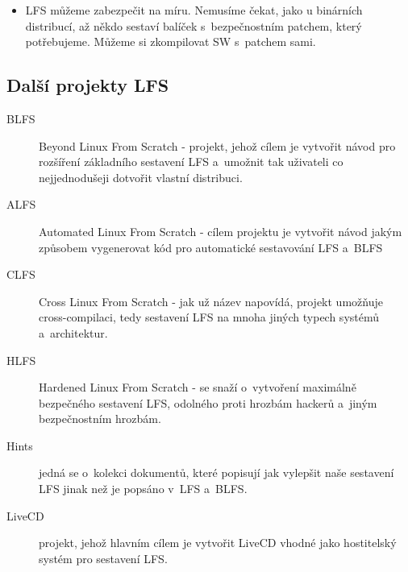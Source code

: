 \documentclass[a4paper,12pt]{article}
\begin{document}
\begin{itemize}

\item LFS můžeme zabezpečit na míru. Nemusíme čekat, jako u binárních distribucí, až někdo sestaví balíček s~bezpečnostním patchem, který potřebujeme. Můžeme si zkompilovat SW s~patchem sami.

\end{itemize}

\subsection{Další projekty LFS}
\begin{description}
 \item[BLFS] Beyond Linux From Scratch - projekt, jehož cílem je vytvořit návod pro rozšíření základního sestavení LFS a~umožnit tak uživateli co nejjednodušeji dotvořit vlastní distribuci.
 \item[ALFS] Automated Linux From Scratch - cílem projektu je vytvořit návod jakým způsobem vygenerovat kód pro automatické sestavování LFS a~BLFS
 \item[CLFS] Cross Linux From Scratch - jak už název napovídá, projekt umožňuje cross-compilaci, tedy sestavení LFS na mnoha jiných typech systémů a~architektur.
 \item[HLFS] Hardened Linux From Scratch - se snaží o~vytvoření maximálně bezpečného sestavení LFS, odolného proti hrozbám hackerů a~jiným bezpečnostním hrozbám.
 \item[Hints] jedná se o~kolekci dokumentů, které popisují jak vylepšit naše sestavení LFS jinak než je popsáno v~LFS a~BLFS.
 \item[LiveCD] projekt, jehož hlavním cílem je vytvořit LiveCD vhodné jako hostitelský systém pro sestavení LFS.
 \end{description}
\end{document}
